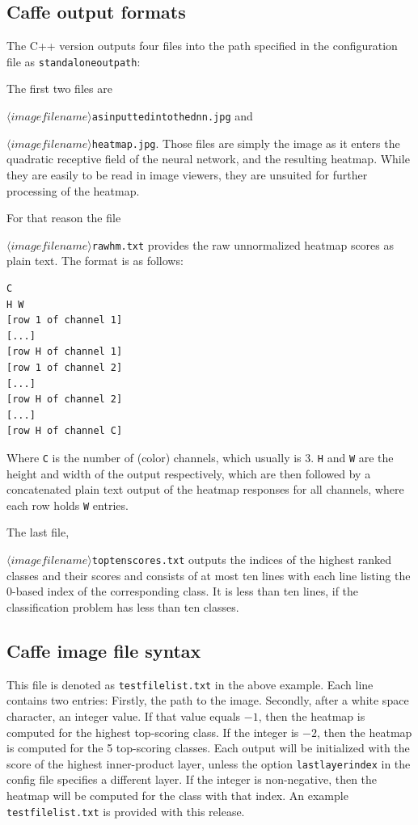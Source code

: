 \documentclass[a4wide]{article}
\begin{document}
\subsection*{Caffe output formats}


The C++ version outputs four files into the path specified in the configuration file as \texttt{standalone\textunderscore outpath}:

The first two files are 

\texttt{$\langle imagefilename\rangle$\textunderscore as\textunderscore inputted\textunderscore into\textunderscore the\textunderscore dnn.jpg} and 

\texttt{$\langle imagefilename\rangle$\textunderscore heatmap.jpg}. Those files are simply the image as it enters the quadratic receptive field of the neural network, and the resulting heatmap. While they are easily to be read in image viewers, they are unsuited for further processing of the heatmap.

For that reason the file 

\texttt{$\langle imagefilename\rangle$\textunderscore rawhm.txt} provides the raw unnormalized heatmap scores as plain text. 
The format is as follows: 

\begin{Verbatim}[frame=single]
C
H W
[row 1 of channel 1]
[...]
[row H of channel 1]
[row 1 of channel 2]
[...]
[row H of channel 2]
[...]
[row H of channel C]
\end{Verbatim}

Where \texttt{C} is the number of (color) channels, which usually is 3. \texttt{H} and \texttt{W} are the height and width of the output respectively, which are then followed by a concatenated plain text output of the heatmap responses for all channels, where each row holds \texttt{W} entries.


The last file,

\texttt{$\langle imagefilename\rangle$\textunderscore toptenscores.txt} outputs the indices of the highest ranked classes and their scores and consists of at most ten lines with each line listing the 0-based index of the corresponding class. It is less than ten lines, if the classification problem has less than ten classes.


\subsection*{Caffe image file syntax}

This file is denoted as \texttt{testfilelist.txt} in the above example. Each line contains two entries: Firstly, the path to the image. Secondly, after a white space character, an integer value.
If that value equals $-1$, then the heatmap is computed for the highest top-scoring class. If the integer is $-2$, then the heatmap is computed for the 5 top-scoring classes. Each output will be initialized with the score of the highest inner-product layer, unless the option \texttt{lastlayerindex} in the config file specifies a different layer. If the integer is non-negative, then the heatmap will be computed for the class with that index. An example \texttt{testfilelist.txt} is provided with this release.
\end{document}
